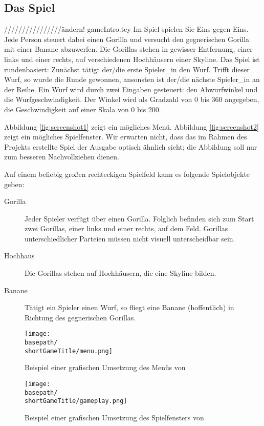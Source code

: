 \subsection{Das Spiel \emph{\gameTitle}}
 ////////////////ändern! gameIntro.tey
Im Spiel \emph{\gameTitle{}} spielen Sie Eins gegen Eins. Jede Person steuert dabei einen Gorilla und versucht den gegnerischen Gorilla mit einer Banane abzuwerfen. Die Gorillas stehen in gewisser Entfernung, einer links und einer rechts, auf verschiedenen Hochh\"ausern einer Skyline. Das Spiel ist rundenbasiert: Zun\"achst t\"atigt der/die erste Spieler\_in den Wurf. Trifft dieser Wurf, so wurde die Runde gewonnen, ansonsten ist der/die n\"achste Spieler\_in an der Reihe. Ein Wurf wird durch zwei Eingaben gesteuert: den Abwurfwinkel und die Wurfgeschwindigkeit. Der Winkel wird als Gradzahl von 0 bis 360 angegeben, die Geschwindigkeit auf einer Skala von 0 bis 200.

Abbildung \vref{fig:screenshot1} zeigt ein m\"ogliches Menü. Abbildung \vref{fig:screenshot2} zeigt ein mögliches Spielfenster. Wir erwarten nicht, dass 
das im Rahmen des Projekts erstellte Spiel der Ausgabe optisch \"ahnlich sieht; die 
Abbildung soll nur zum besseren Nachvollziehen dienen.

Auf einem beliebig großen rechteckigen Spielfeld kann es folgende Spielobjekte geben:
\begin{description}
\item[Gorilla]
Jeder Spieler verfügt über einen Gorilla. Folglich befinden sich zum Start zwei Gorillas, einer links und einer rechts, auf dem Feld. Gorillas unterschiedlicher Parteien müssen nicht visuell unterscheidbar sein.
\item[Hochhaus]
Die Gorillas stehen auf Hochhäusern, die eine Skyline bilden.
\item[Banane]
Tätigt ein Spieler einen Wurf, so fliegt eine Banane (hoffentlich) in Richtung des gegnerischen Gorillas.
\end{description}

\begin{figure}[htb]
\begin{center}
\texttt{[image: \\basepath/\\shortGameTitle/menu.png]}
\caption{Beispiel einer grafischen Umsetzung des Menüs von \gameTitle}
\label{fig:screenshot1}
\end{center}
\end{figure}

\begin{figure}[htb]
\begin{center}
\texttt{[image: \\basepath/\\shortGameTitle/gameplay.png]}
\caption{Beispiel einer grafischen Umsetzung des Spielfensters von \gameTitle}
\label{fig:screenshot2}
\end{center}
\end{figure}

